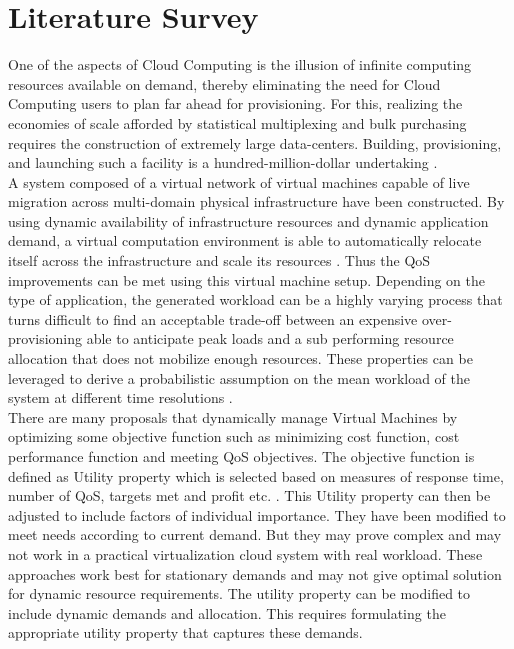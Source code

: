 \documentclass[conference]{IEEEtran}
\begin{document}
\section{Literature Survey}
One of the aspects of Cloud Computing is the illusion of infinite computing resources available on demand, thereby eliminating the need for Cloud Computing users to plan far ahead for provisioning. For this, realizing the economies of scale afforded by statistical multiplexing and bulk purchasing requires the construction of extremely large data-centers. Building, provisioning, and launching such a facility is a hundred-million-dollar undertaking \cite{Berkeley}.\\[0.2cm]
A system composed of a virtual network of virtual machines capable of live migration across multi-domain physical infrastructure have been constructed. By using dynamic availability of infrastructure resources and dynamic application demand, a virtual computation environment is able to automatically relocate itself across the infrastructure and scale its resources \cite{SRAS}. Thus the QoS improvements can be met using this virtual machine setup. Depending on the type of application, the generated workload can be a highly varying process that turns difficult to find an acceptable trade-off between an expensive over-provisioning able to anticipate peak loads and a sub performing resource allocation that does not mobilize enough resources. These properties can be leveraged to derive a probabilistic assumption on the mean workload of the system at different time resolutions \cite{DRMC}.\\[0.2cm]
There are many proposals that dynamically manage Virtual Machines by optimizing some objective function such as minimizing cost function, cost performance function and meeting QoS objectives. The objective function is defined as Utility property which is selected based on measures of response time, number of QoS, targets met and profit etc. \cite{SRAS}. This Utility property can then be adjusted to include factors of individual importance. They have been modified to meet needs according to current demand. But they may prove complex and  may not work in a practical virtualization cloud system with real workload. These approaches work best for stationary demands and may not give optimal solution for dynamic resource requirements. The utility property can be modified to include dynamic demands and allocation. This requires formulating the appropriate utility property that captures these demands.
\end{document}
